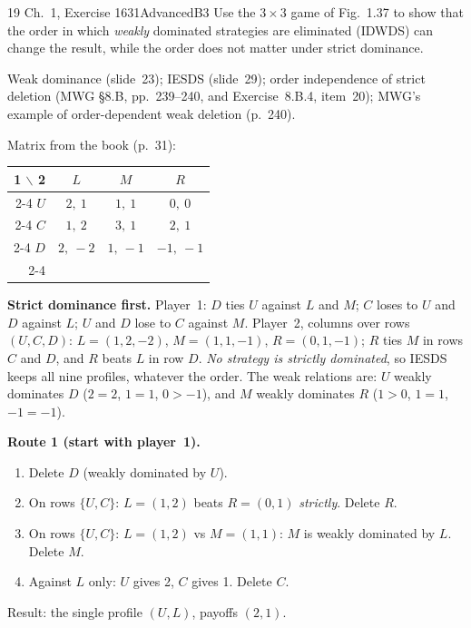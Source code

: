 \begin{exsol}{19}{\MG{} Ch.~1, Exercise 16}{31}{Advanced}{B3}
\asked Use the $3 \times 3$ game of Fig.~1.37 to show that the order in which \emph{weakly}
dominated strategies are eliminated (IDWDS) can change the result, while the order does not
matter under strict dominance.

\method Weak dominance (slide~23); IESDS (slide~29); order independence of strict deletion
(MWG \S8.B, pp.~239--240, and Exercise~8.B.4, item~20); MWG's example of order-dependent weak
deletion (p.~240).

\solution
Matrix from the book (p.~31):
\begin{center}
\begin{tabular}{r|c|c|c|}
\multicolumn{1}{r}{1 $\backslash$ 2} & \multicolumn{1}{c}{$L$} & \multicolumn{1}{c}{$M$} & \multicolumn{1}{c}{$R$}\\ \cline{2-4}
$U$ & $2,\ 1$ & $1,\ 1$ & $0,\ 0$ \\ \cline{2-4}
$C$ & $1,\ 2$ & $3,\ 1$ & $2,\ 1$ \\ \cline{2-4}
$D$ & $2,\ -2$ & $1,\ -1$ & $-1,\ -1$ \\ \cline{2-4}
\end{tabular}
\end{center}

\textbf{Strict dominance first.} Player~1: $D$ ties $U$ against $L$ and $M$; $C$ loses to $U$
and $D$ against $L$; $U$ and $D$ lose to $C$ against $M$. Player~2, columns over rows
$(U, C, D)$: $L = (1, 2, -2)$, $M = (1, 1, -1)$, $R = (0, 1, -1)$; $R$ ties $M$ in rows $C$ and
$D$, and $R$ beats $L$ in row $D$. \emph{No strategy is strictly dominated}, so IESDS keeps all
nine profiles, whatever the order. The weak relations are: $U$ weakly dominates $D$
($2 = 2$, $1 = 1$, $0 > -1$), and $M$ weakly dominates $R$ ($1 > 0$, $1 = 1$, $-1 = -1$).

\textbf{Route 1 (start with player~1).}
\begin{enumerate}
  \item Delete $D$ (weakly dominated by $U$).
  \item On rows $\{U, C\}$: $L = (1, 2)$ beats $R = (0, 1)$ \emph{strictly}. Delete $R$.
  \item On rows $\{U, C\}$: $L = (1, 2)$ vs $M = (1, 1)$: $M$ is weakly dominated by $L$. Delete $M$.
  \item Against $L$ only: $U$ gives 2, $C$ gives 1. Delete $C$.
\end{enumerate}
Result: the single profile $(U, L)$, payoffs $(2, 1)$.


\end{exsol}
